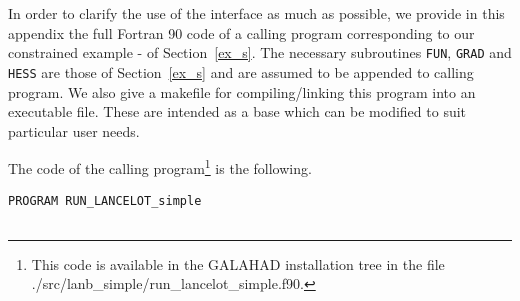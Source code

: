 \documentclass{article}
\begin{document}
In order to clarify the use of the interface as much as possible, we provide
in this appendix the full Fortran 90 code of a calling program corresponding to
our constrained example - of Section~\ref{ex_s}.   The
necessary subroutines  {\tt  FUN}, {\tt GRAD} and {\tt HESS} are those of
Section~\ref{ex_s} and are assumed to be appended to calling program.
We also give a makefile for compiling/linking this program into an executable
file. These are intended as a base which can be modified to suit particular
user needs. 

The code of the calling program\footnote{This code is available
in the {\sf GALAHAD} installation tree in the file
./src/lanb\_simple/run\_lancelot\_simple.f90.} is the following.

\begin{lstlisting}
PROGRAM RUN_LANCELOT_simple


\end{lstlisting}
\end{document}
